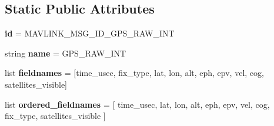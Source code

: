 \subsection*{Static Public Attributes}
\begin{DoxyCompactItemize}
\item 
\mbox{\label{classpymavlink_1_1dialects_1_1v10_1_1MAVLink__gps__raw__int__message_a062fd4ac19d59532554f2585a857b45f}} 
{\bfseries id} = M\+A\+V\+L\+I\+N\+K\+\_\+\+M\+S\+G\+\_\+\+I\+D\+\_\+\+G\+P\+S\+\_\+\+R\+A\+W\+\_\+\+I\+NT
\item 
\mbox{\label{classpymavlink_1_1dialects_1_1v10_1_1MAVLink__gps__raw__int__message_ac44249ddfc1844039a4c6c30c6e77e21}} 
string {\bfseries name} = \textquotesingle{}G\+P\+S\+\_\+\+R\+A\+W\+\_\+\+I\+NT\textquotesingle{}
\item 
\mbox{\label{classpymavlink_1_1dialects_1_1v10_1_1MAVLink__gps__raw__int__message_a59bd0a7c089ff20e74da9cb7870f7669}} 
list {\bfseries fieldnames} = \mbox{[}\textquotesingle{}time\+\_\+usec\textquotesingle{}, \textquotesingle{}fix\+\_\+type\textquotesingle{}, \textquotesingle{}lat\textquotesingle{}, \textquotesingle{}lon\textquotesingle{}, \textquotesingle{}alt\textquotesingle{}, \textquotesingle{}eph\textquotesingle{}, \textquotesingle{}epv\textquotesingle{}, \textquotesingle{}vel\textquotesingle{}, \textquotesingle{}cog\textquotesingle{}, \textquotesingle{}satellites\+\_\+visible\textquotesingle{}\mbox{]}
\item 
\mbox{\label{classpymavlink_1_1dialects_1_1v10_1_1MAVLink__gps__raw__int__message_a57ea6d05445e04b84cece4b5bf2ab70c}} 
list {\bfseries ordered\+\_\+fieldnames} = \mbox{[} \textquotesingle{}time\+\_\+usec\textquotesingle{}, \textquotesingle{}lat\textquotesingle{}, \textquotesingle{}lon\textquotesingle{}, \textquotesingle{}alt\textquotesingle{}, \textquotesingle{}eph\textquotesingle{}, \textquotesingle{}epv\textquotesingle{}, \textquotesingle{}vel\textquotesingle{}, \textquotesingle{}cog\textquotesingle{}, \textquotesingle{}fix\+\_\+type\textquotesingle{}, \textquotesingle{}satellites\+\_\+visible\textquotesingle{} \mbox{]}

\end{DoxyCompactItemize}
